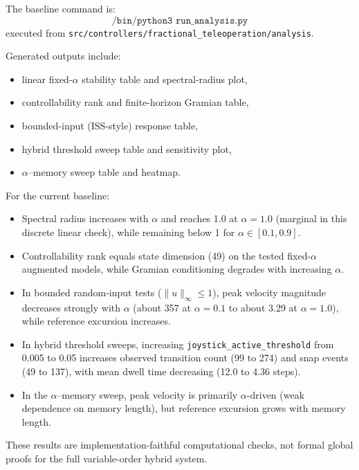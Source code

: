 \documentclass[11pt,a4paper]{article}
\begin{document}
The baseline command is:
\begin{equation}
\texttt{/bin/python3 run\_analysis.py}
\end{equation}
executed from \texttt{src/controllers/fractional\_teleoperation/analysis}.

Generated outputs include:
\begin{itemize}[leftmargin=*]
\item linear fixed-$\alpha$ stability table and spectral-radius plot,
\item controllability rank and finite-horizon Gramian table,
\item bounded-input (ISS-style) response table,
\item hybrid threshold sweep table and sensitivity plot,
\item $\alpha$--memory sweep table and heatmap.
\end{itemize}

For the current baseline:
\begin{itemize}[leftmargin=*]
\item Spectral radius increases with $\alpha$ and reaches 1.0 at $\alpha=1.0$ (marginal in this discrete linear check), while remaining below 1 for $\alpha \in [0.1,0.9]$.
\item Controllability rank equals state dimension (49) on the tested fixed-$\alpha$ augmented models, while Gramian conditioning degrades with increasing $\alpha$.
\item In bounded random-input tests ($\|u\|_\infty \le 1$), peak velocity magnitude decreases strongly with $\alpha$ (about 357 at $\alpha=0.1$ to about 3.29 at $\alpha=1.0$), while reference excursion increases.
\item In hybrid threshold sweeps, increasing \texttt{joystick\_active\_threshold} from 0.005 to 0.05 increases observed transition count (99 to 274) and snap events (49 to 137), with mean dwell time decreasing (12.0 to 4.36 steps).
\item In the $\alpha$--memory sweep, peak velocity is primarily $\alpha$-driven (weak dependence on memory length), but reference excursion grows with memory length.
\end{itemize}

These results are implementation-faithful computational checks, not formal global proofs for the full variable-order hybrid system.
\end{document}
